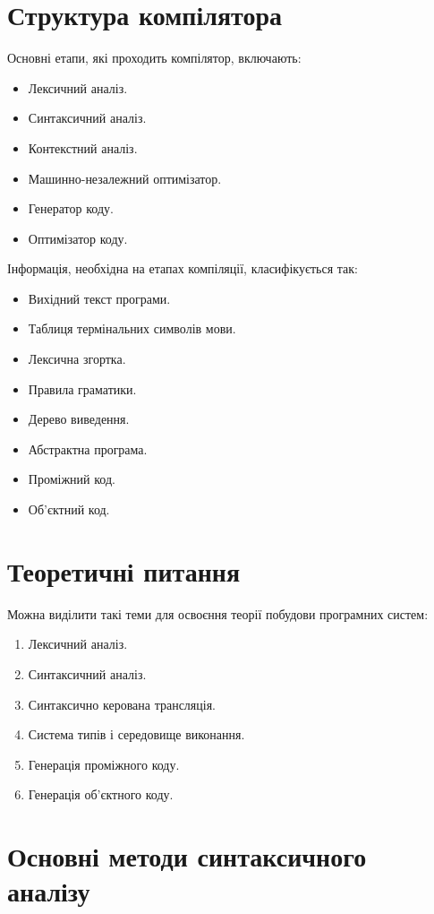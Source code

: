 \documentclass{memoir}
\begin{document}
\section{Структура компілятора}
Основні етапи, які проходить компілятор, включають:
\begin{itemize}
    \item Лексичний аналіз.
    \item Синтаксичний аналіз.
    \item Контекстний аналіз.
    \item Машинно-незалежний оптимізатор.
    \item Генератор коду.
    \item Оптимізатор коду.
\end{itemize}
Інформація, необхідна на етапах компіляції, класифікується так:
\begin{itemize}
    \item Вихідний текст програми.
    \item Таблиця термінальних символів мови.
    \item Лексична згортка.
    \item Правила граматики.
    \item Дерево виведення.
    \item Абстрактна програма.
    \item Проміжний код.
    \item Об’єктний код.
\end{itemize}

\section{Теоретичні питання}
Можна виділити такі теми для освоєння теорії побудови програмних систем:
\begin{enumerate}
    \item Лексичний аналіз.
    \item Синтаксичний аналіз.
    \item Синтаксично керована трансляція.
    \item Система типів і середовище виконання.
    \item Генерація проміжного коду.
    \item Генерація об’єктного коду.
\end{enumerate}

\section{Основні методи синтаксичного аналізу}
\end{document}
